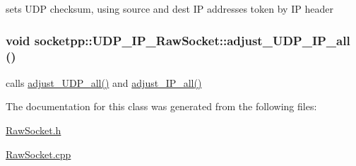 sets UDP checksum, using source and dest IP addresses token by IP header 

\hypertarget{classsocketpp_1_1UDP__IP__RawSocket_1a0f6360760f94f5c1569adde67d6d1b}{
\subsubsection[{adjust\_\-UDP\_\-IP\_\-all}]{\setlength{\rightskip}{0pt plus 5cm}void socketpp::UDP\_\-IP\_\-RawSocket::adjust\_\-UDP\_\-IP\_\-all ()}}
\label{classsocketpp_1_1UDP__IP__RawSocket_1a0f6360760f94f5c1569adde67d6d1b}


calls \hyperlink{classsocketpp_1_1UDP__IP__RawSocket_94bec31d8c856ccdafa083c74b8b7e58}{adjust\_\-UDP\_\-all()} and \hyperlink{classsocketpp_1_1IP__RawSocket_45e60510233daaa2f279d3a4706fdce5}{adjust\_\-IP\_\-all()} 



The documentation for this class was generated from the following files:\begin{CompactItemize}
\item 
\hyperlink{RawSocket_8h}{RawSocket.h}\item 
\hyperlink{RawSocket_8cpp}{RawSocket.cpp}\end{CompactItemize}

